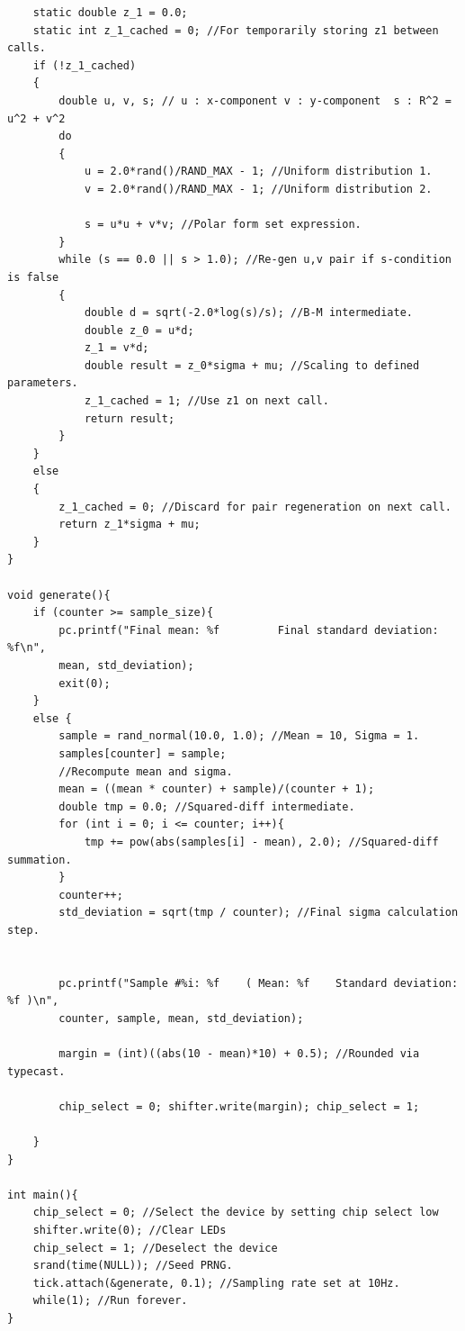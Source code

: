\documentclass{article}
\begin{document}
\begin{verbatim}
    static double z_1 = 0.0;
    static int z_1_cached = 0; //For temporarily storing z1 between calls.
    if (!z_1_cached)
    {
        double u, v, s; // u : x-component v : y-component  s : R^2 = u^2 + v^2
        do
        {
            u = 2.0*rand()/RAND_MAX - 1; //Uniform distribution 1.
            v = 2.0*rand()/RAND_MAX - 1; //Uniform distribution 2.

            s = u*u + v*v; //Polar form set expression.
        }
        while (s == 0.0 || s > 1.0); //Re-gen u,v pair if s-condition is false
        {
            double d = sqrt(-2.0*log(s)/s); //B-M intermediate.
            double z_0 = u*d;
            z_1 = v*d;
            double result = z_0*sigma + mu; //Scaling to defined parameters.
            z_1_cached = 1; //Use z1 on next call.
            return result;
        }
    }
    else
    {
        z_1_cached = 0; //Discard for pair regeneration on next call.
        return z_1*sigma + mu;
    }
}

void generate(){
    if (counter >= sample_size){
        pc.printf("Final mean: %f         Final standard deviation: %f\n",
        mean, std_deviation);
        exit(0);   
    }
    else {
        sample = rand_normal(10.0, 1.0); //Mean = 10, Sigma = 1.
        samples[counter] = sample;
        //Recompute mean and sigma.
        mean = ((mean * counter) + sample)/(counter + 1);
        double tmp = 0.0; //Squared-diff intermediate.
        for (int i = 0; i <= counter; i++){
            tmp += pow(abs(samples[i] - mean), 2.0); //Squared-diff summation.
        }
        counter++;
        std_deviation = sqrt(tmp / counter); //Final sigma calculation step.
        
        
        pc.printf("Sample #%i: %f    ( Mean: %f    Standard deviation: %f )\n",
        counter, sample, mean, std_deviation);
        
        margin = (int)((abs(10 - mean)*10) + 0.5); //Rounded via typecast.

        chip_select = 0; shifter.write(margin); chip_select = 1;
        
    }
}

int main(){
    chip_select = 0; //Select the device by setting chip select low
    shifter.write(0); //Clear LEDs
    chip_select = 1; //Deselect the device
    srand(time(NULL)); //Seed PRNG.
    tick.attach(&generate, 0.1); //Sampling rate set at 10Hz.
    while(1); //Run forever.
}
\end{verbatim}
\end{document}
